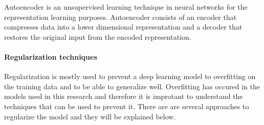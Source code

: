 \begin{definition}[Autoencoder]
	Autoencoder is an unsupervised learning technique in neural networks for the representation learning purposes. Autoencoder consists of an encoder that compresses data into a lower dimensional representation and a decoder that restores the original input from the encoded representation.
\end{definition}

\paragraph{Regularization techniques}
\label{section:regularization-theory}
Regularization is mostly used to prevent a deep learning model to overfitting on the training data and to be able to generalize well. Overfitting has occured in the models used in this research and therefore it is improtant to understand the techniques that can be used to prevent it. There are are several approaches to regularize the model and they will be explained below.

